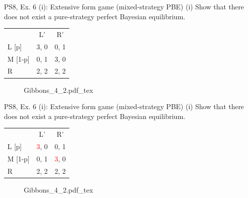 \begin{frame}{PS8, Ex. 6 (i): Extensive form game (mixed-strategy PBE)}
    (i) Show that there does not exist a pure-strategy perfect Bayesian equilibrium.
    \begin{multicols}{2}
      \begin{table}
        \begin{tabular}{l|c|c|}
          \multicolumn{1}{c}{} & \multicolumn{1}{c}{L'} & \multicolumn{1}{c}{R'} \\\cline{2-3}
          L [p]   & 3, 0 & 0, 1 \\\cline{2-3}
          M [1-p] & 0, 1 & 3, 0 \\\cline{2-3}
          R       & 2, 2 & 2, 2 \\\cline{2-3}
        \end{tabular}
      \end{table} \vspace{-4pt}
      \vfill\null\columnbreak
      \begin{figure}[!h]
        \center {}
        {Gibbons_4_2.pdf_tex}
      \end{figure}
      \vfill\null
    \end{multicols}
\end{frame}
\begin{frame}{PS8, Ex. 6 (i): Extensive form game (mixed-strategy PBE)}
    (i) Show that there does not exist a pure-strategy perfect Bayesian equilibrium.
    \begin{multicols}{2}
      \begin{table}
        \begin{tabular}{l|c|c|}
          \multicolumn{1}{c}{} & \multicolumn{1}{c}{L'} & \multicolumn{1}{c}{R'} \\\cline{2-3}
          L [p]   & \textcolor{red}{3}, 0 & 0, \color{blue}1 \\\cline{2-3}
          M [1-p] & 0, \color{blue}1 & \textcolor{red}{3}, 0 \\\cline{2-3}
          R       & 2, \color{blue}2 & 2, \color{blue}2 \\\cline{2-3}
        \end{tabular}
      \end{table} \vspace{-4pt}
      \vfill\null\columnbreak
      \begin{figure}[!h]
        \center {}
        {Gibbons_4_2.pdf_tex}
      \end{figure}
      \vfill\null
    \end{multicols}
\end{frame}
